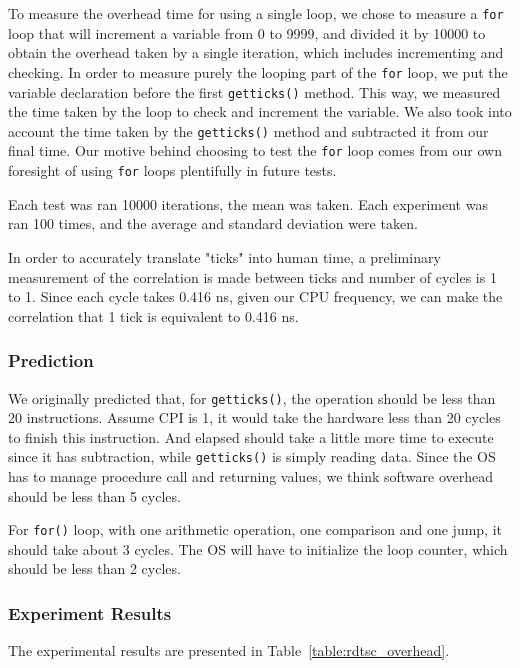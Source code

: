\documentclass{article} %
\begin{document}
To measure the overhead time for using a single loop, we chose to measure
a \texttt{for} loop that will increment a variable from 0 to 9999, and
divided it by 10000 to obtain the overhead taken by a single iteration, which
includes incrementing and checking. In order to measure purely the looping
part of the \texttt{for} loop, we put the variable declaration before the
first \texttt{getticks()} method. This way, we measured the time taken by the
loop to check and increment the variable. We also took into account the time
taken by the \texttt{getticks()} method and subtracted it from our final time.
Our motive behind choosing to test the \texttt{for} loop comes from our own foresight
of using \texttt{for} loops plentifully in future tests.

Each test was ran 10000 iterations, the mean was taken.  Each experiment was
ran 100 times, and the average and standard deviation were taken.

In order to accurately translate "ticks" into human time, a preliminary
measurement of the correlation is made between ticks and number of cycles is
1 to 1.  Since each cycle takes 0.416 ns, given our CPU frequency, we can make
the correlation that 1 tick is equivalent to 0.416 ns.
\subsubsection{Prediction}
We originally predicted that, for \texttt{getticks()}, the operation should be
less than 20 instructions. Assume CPI is 1, it would take the hardware less
than 20 cycles to finish this instruction. And elapsed should take a little
more time to execute since it has subtraction, while \texttt{getticks()} is
simply reading data. Since the OS has to manage procedure call and returning
values, we think software overhead should be less than 5 cycles.

For \texttt{for()} loop, with one arithmetic operation, one comparison and one
jump, it should take about 3 cycles. The OS will have to initialize the loop
counter, which should be less than 2 cycles.

\subsubsection{Experiment Results}

The experimental results are presented in Table~\ref{table:rdtsc_overhead}.
\end{document}
